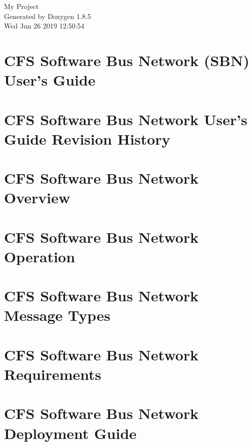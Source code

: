 \documentclass[twoside]{book}
\newcommand{\clearemptydoublepage}{%
  \newpage{\pagestyle{empty}\cleardoublepage}%
}
\begin{document}
\hypersetup{pageanchor=false}
\begin{titlepage}
\vspace*{7cm}
\begin{center}%
{\Large My Project }\\
\vspace*{1cm}
{\large Generated by Doxygen 1.8.5}\\
\vspace*{0.5cm}
{\small Wed Jun 26 2019 12:50:54}\\
\end{center}
\end{titlepage}
\clearemptydoublepage
\tableofcontents
\clearemptydoublepage
{}
\hypersetup{pageanchor=true}

\chapter{C\-F\-S Software Bus Network (S\-B\-N) User's Guide}
\label{index}\hypertarget{index}{}
\chapter{C\-F\-S Software Bus Network User's Guide Revision History}
\label{cfssbnrevhist}
\hypertarget{cfssbnrevhist}{}

\chapter{C\-F\-S Software Bus Network Overview}
\label{cfssbnovr}
\hypertarget{cfssbnovr}{}

\chapter{C\-F\-S Software Bus Network Operation}
\label{cfssbnopr}
\hypertarget{cfssbnopr}{}

\chapter{C\-F\-S Software Bus Network Message Types}
\label{cfssbnmsgs}
\hypertarget{cfssbnmsgs}{}

\chapter{C\-F\-S Software Bus Network Requirements}
\label{cfssbnreq}
\hypertarget{cfssbnreq}{}

\chapter{C\-F\-S Software Bus Network Deployment Guide}
\label{cfssbndg}
\hypertarget{cfssbndg}{}

\end{document}

